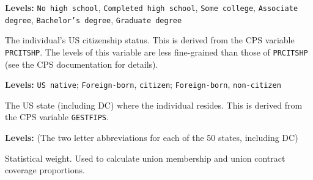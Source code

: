 \documentclass[letterpaper,12pt]{article}
\begin{document}
\begin{description}[style=multiline,leftmargin=3cm,font=\normalfont]
\textbf{Levels:} \texttt{No high school}, \texttt{Completed high school},
\texttt{Some college}, \texttt{Associate degree}, \texttt{Bachelor's degree},
\texttt{Graduate degree}

\item[\texttt{citizen}] The individual's US citizenship status. This is derived
from the CPS variable \texttt{PRCITSHP}. The levels of this variable are less
fine-grained than those of \texttt{PRCITSHP} (see the CPS documentation for
details).

\textbf{Levels:} \texttt{US native}; \texttt{Foreign-born}, \texttt{citizen};
\texttt{Foreign-born}, \texttt{non-citizen}

\item[\texttt{state}] The US state (including DC) where the individual resides.
This is derived from the CPS variable \texttt{GESTFIPS}.

\textbf{Levels:} (The two letter abbreviations for each of the 50 states,
including DC)

\item[\texttt{weight}] Statistical weight. Used to calculate union membership
and union contract coverage proportions.

\end{description}
\end{document}
